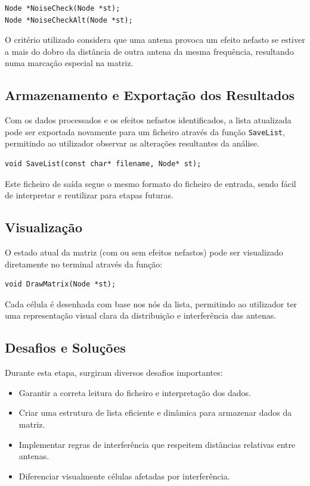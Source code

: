 \documentclass[a4paper,12pt]{article}
\begin{document}
\begin{lstlisting}[style=CStyle]
Node *NoiseCheck(Node *st);
Node *NoiseCheckAlt(Node *st);
\end{lstlisting}

O critério utilizado considera que uma antena provoca um efeito nefasto se estiver a mais do dobro da distância de outra antena da mesma frequência, resultando numa marcação especial na matriz.

\subsection{Armazenamento e Exportação dos Resultados}
Com os dados processados e os efeitos nefastos identificados, a lista atualizada pode ser exportada novamente para um ficheiro através da função \texttt{SaveList}, permitindo ao utilizador observar as alterações resultantes da análise.

\begin{lstlisting}[style=CStyle]
void SaveList(const char* filename, Node* st);
\end{lstlisting}

Este ficheiro de saída segue o mesmo formato do ficheiro de entrada, sendo fácil de interpretar e reutilizar para etapas futuras.

\subsection{Visualização}
O estado atual da matriz (com ou sem efeitos nefastos) pode ser visualizado diretamente no terminal através da função:

\begin{lstlisting}[style=CStyle]
void DrawMatrix(Node *st);
\end{lstlisting}

Cada célula é desenhada com base nos nós da lista, permitindo ao utilizador ter uma representação visual clara da distribuição e interferência das antenas.

\subsection{Desafios e Soluções}
Durante esta etapa, surgiram diversos desafios importantes:

\begin{itemize}
    \item Garantir a correta leitura do ficheiro e interpretação dos dados.
    \item Criar uma estrutura de lista eficiente e dinâmica para armazenar dados da matriz.
    \item Implementar regras de interferência que respeitem distâncias relativas entre antenas.
    \item Diferenciar visualmente células afetadas por interferência.
\end{itemize}
\end{document}
